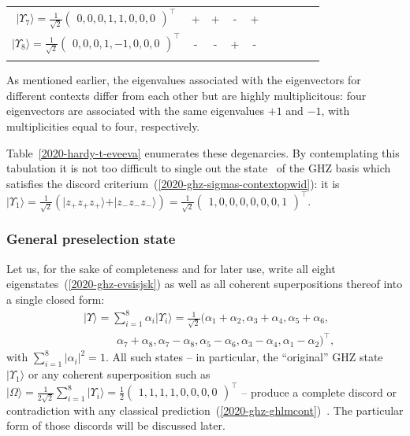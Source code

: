 \documentclass[sn-mathphys]{sn-jnl}%
\theoremstyle{thmstyleone}%
\theoremstyle{thmstyletwo}%
\theoremstyle{thmstylethree}%
\begin{document}
\begin{table}[t]
\begin{center}
\begin{tabular}{ c c c c c c c c c c }
$\vert \Upsilon_7 \rangle = \frac{1}{\sqrt{2}}\begin{pmatrix} 0, 0, 0, 1, 1, 0, 0, 0 \end{pmatrix}^\intercal $ & {\Large +} & {\Large +} &  {\Large -} & {\Large +}\\
$\vert \Upsilon_8 \rangle = \frac{1}{\sqrt{2}}\begin{pmatrix} 0, 0, 0, 1,- 1, 0, 0, 0 \end{pmatrix}^\intercal$ & {\Large -} & {\Large -} &  {\Large +} & {\Large -}\\
\botrule
\end{tabular}
 \end{center}
 \end{table}
As mentioned earlier, the eigenvalues associated with the eigenvectors
for different contexts differ from each other but are highly multiplicitous: four eigenvectors are associated with
the same eigenvalues
$+1$ and $-1$, with  multiplicities equal to four, respectively.

Table~\ref{2020-hardy-t-eveeva} enumerates these degenarcies.
By contemplating this tabulation it is not too difficult
to single out the state~\cite{mermin}
of the GHZ basis which satisfies the discord criterium~(\ref{2020-ghz-sigmas-contextopwid}):
it is  $\vert \Upsilon_1 \rangle = \frac{1}{\sqrt{2}}\left( \vert z_+z_+z_+ \rangle  + \vert z_-z_-z_- \rangle \right)=\frac{1}{\sqrt{2}}\begin{pmatrix} 1, 0, 0, 0, 0, 0, 0, 1 \end{pmatrix}^\intercal$.

\subsubsection{General preselection state}

Let us, for the sake of completeness and for later use, write
all eight eigenstates~(\ref{2020-ghz-evsisjsk})
as well as all coherent superpositions thereof into a single closed form:
\begin{equation}
\begin{aligned}
& \vert \Upsilon  \rangle = \sum_{i=1}^8 \alpha_i \vert \Upsilon_i \rangle =
\frac{1}{\sqrt{2}} \Big( \alpha_1+\alpha_2,\alpha_3+\alpha_4,\alpha_5+\alpha_6,\\
  &\qquad \quad \alpha_7+ \alpha_8,\alpha_7-\alpha_8,\alpha_5-\alpha_6,\alpha_3-\alpha_4,\alpha_1-\alpha_2 \big)^\intercal ,
\end{aligned}
\label{2020-ghz-psiGHZ}
\end{equation}
with $\sum_{i=1}^8 \vert  \alpha_i  \vert^2  =1$.
All such states -- in particular, the ``original''
GHZ state
$\vert \Upsilon_1 \rangle$
or any coherent superposition such as
$
\vert \Omega \rangle =
 \frac{1}{2\sqrt{2}} \sum_{i=1}^8 \vert \Upsilon_i \rangle =
\frac{1}{2} \begin{pmatrix} 1,1,1,1,0,0,0,0 \end{pmatrix}^\intercal
$
--
produce a complete discord or contradiction with any classical prediction~(\ref{2020-ghz-ghlmcont})~\cite[Appendix]{mermin1}.
The particular form of those discords will be discussed later.
\end{document}
